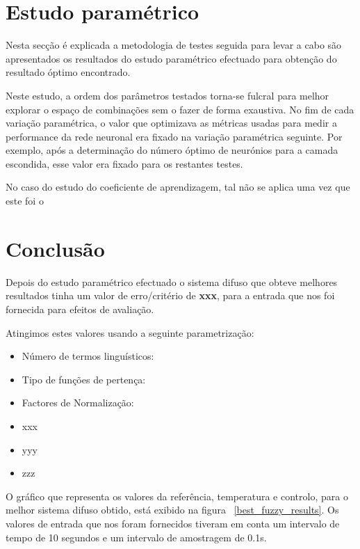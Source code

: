 \documentclass{article}
\begin{document}
\clearpage
\section{Estudo paramétrico}
\indent \indent Nesta secção é explicada a metodologia de testes seguida para levar a cabo são apresentados os resultados do estudo paramétrico efectuado para obtenção do resultado óptimo encontrado.

Neste estudo, a ordem dos parâmetros testados torna-se fulcral para melhor explorar o espaço de combinações sem o fazer de forma exaustiva. No fim de cada variação paramétrica, o valor que optimizava as métricas usadas para medir a performance da rede neuronal era fixado na variação paramétrica seguinte. Por exemplo, após a determinação do número óptimo de neurónios para a camada escondida, esse valor era fixado para os restantes testes.

No caso do estudo do coeficiente de aprendizagem, tal não se aplica uma vez que este foi o 



\clearpage
\section{Conclusão}
\indent \indent Depois do estudo paramétrico efectuado o sistema difuso que obteve melhores resultados tinha um valor de erro/critério de \textbf{xxx}, para a entrada que nos foi fornecida para efeitos de avaliação.

Atingimos estes valores usando a seguinte parametrização:
\begin{itemize}
\item Número de termos linguísticos:
\item Tipo de funções de pertença:
\item Factores de Normalização:
\item xxx
\item yyy
\item zzz
\end{itemize}

O gráfico que representa os valores da referência, temperatura e controlo, para o melhor sistema difuso obtido, está exibido na figura ~\ref{best_fuzzy_results}. Os valores de entrada que nos foram fornecidos tiveram em conta um intervalo de tempo de 10 segundos e um intervalo de amostragem de 0.1s.
\end{document}
